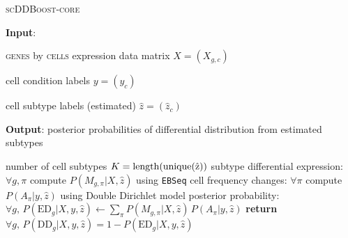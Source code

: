 \documentclass[aoas,preprint]{imsart}
\begin{document}
\begin{algorithm}
\caption{\textsc{scDDBoost-core}}\label{alg:scDDcore}
\raggedright\hspace*{\algorithmicindent} \textbf{Input}: \begin{list}{}{}
 \item \textsc{genes} by \textsc{cells} expression data matrix $X=(X_{g,c})$
 \item  cell condition labels $y=(y_c)$ 
 \item  cell subtype labels (estimated)  $\hat z=(\hat z_c)$
 \end{list}
\hspace*{\algorithmicindent} 
\textbf{Output}:  posterior probabilities of differential distribution from estimated subtypes
\begin{algorithmic}[1]
 \item  number of cell subtypes $K = \rm{length}( \rm{unique}( \hat z ) )$  
\State subtype differential expression: $\forall g,\pi$ compute  $P(M_{g,\pi} | X, \hat z)$ using \verb+EBSeq+
\State cell frequency changes: $\forall \pi$ compute  $P(A_\pi | y, \hat z)$ using Double Dirichlet model 
\State posterior probability: $\forall g,  \, P(\text{ED}_g | X, y, \hat z)\gets \underset{\pi}{\sum}P(M_{g,\pi} | X, \hat z) \,
 P(A_\pi | y, \hat z)$
\State \textbf{return} $\forall g, \, P(\text{DD}_g |X, y, \hat z)=1-P(\text{ED}_g| X,y, \hat z)$
\EndProcedure
\end{algorithmic}
\end{algorithm}



\end{document}
